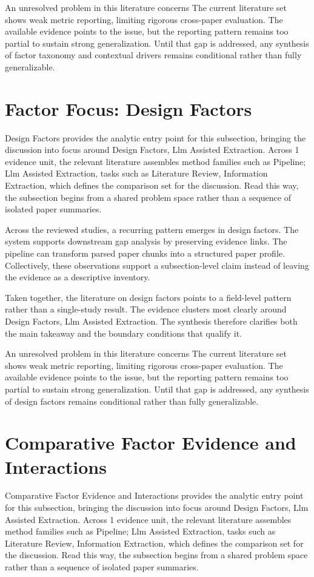 \documentclass{article}
\begin{document}
An unresolved problem in this literature concerns The current literature set shows weak metric reporting, limiting rigorous cross-paper evaluation. The available evidence points to the issue, but the reporting pattern remains too partial to sustain strong generalization. Until that gap is addressed, any synthesis of factor taxonomy and contextual drivers remains conditional rather than fully generalizable. \cite{01_2001_hamed_safety_science}

\section{Factor Focus: Design Factors}
Design Factors provides the analytic entry point for this subsection, bringing the discussion into focus around Design Factors, Llm Assisted Extraction. Across 1 evidence unit, the relevant literature assembles method families such as Pipeline; Llm Assisted Extraction, tasks such as Literature Review, Information Extraction, which defines the comparison set for the discussion. Read this way, the subsection begins from a shared problem space rather than a sequence of isolated paper summaries. \cite{01_2001_hamed_safety_science}

Across the reviewed studies, a recurring pattern emerges in design factors. The system supports downstream gap analysis by preserving evidence links. The pipeline can transform parsed paper chunks into a structured paper profile. Collectively, these observations support a subsection-level claim instead of leaving the evidence as a descriptive inventory. \cite{01_2001_hamed_safety_science}

Taken together, the literature on design factors points to a field-level pattern rather than a single-study result. The evidence clusters most clearly around Design Factors, Llm Assisted Extraction. The synthesis therefore clarifies both the main takeaway and the boundary conditions that qualify it. \cite{01_2001_hamed_safety_science}

An unresolved problem in this literature concerns The current literature set shows weak metric reporting, limiting rigorous cross-paper evaluation. The available evidence points to the issue, but the reporting pattern remains too partial to sustain strong generalization. Until that gap is addressed, any synthesis of design factors remains conditional rather than fully generalizable. \cite{01_2001_hamed_safety_science}

\section{Comparative Factor Evidence and Interactions}
Comparative Factor Evidence and Interactions provides the analytic entry point for this subsection, bringing the discussion into focus around Design Factors, Llm Assisted Extraction. Across 1 evidence unit, the relevant literature assembles method families such as Pipeline; Llm Assisted Extraction, tasks such as Literature Review, Information Extraction, which defines the comparison set for the discussion. Read this way, the subsection begins from a shared problem space rather than a sequence of isolated paper summaries. \cite{01_2001_hamed_safety_science}
\end{document}
